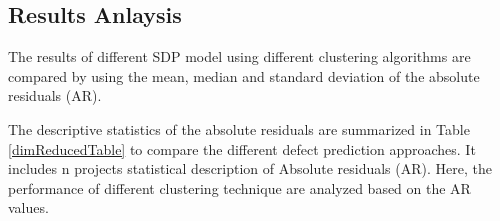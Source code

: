 \documentclass[12pt]{report}
\begin{document}
\subsection{Results Anlaysis}

The results of different SDP model using different clustering algorithms are compared by using the mean, median and standard deviation of the absolute residuals (AR).  

The descriptive statistics of the absolute residuals are summarized in Table \ref{dimReducedTable} to compare the different defect prediction approaches. It includes n projects statistical description of Absolute residuals (AR). Here, the performance of different clustering technique are analyzed based on the AR values.
%
\end{document}
